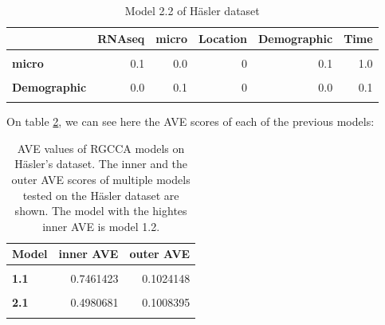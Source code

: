 \documentclass[
  a4paper,
]{book}
\begin{document}
\begin{table}[H]

\caption[Model 2.2 of Häsler dataset]{\label{tab:hasler-model-2-2}Model 2.2 of Häsler dataset}
\centering
\begin{tabular}[t]{|>{}l|>{}r||r|r|r|r}
\hline
\textbf{ } & \textbf{RNAseq} & \textbf{micro} & \textbf{Location} & \textbf{Demographic} & \textbf{Time}\\
\hline
\textbf{\cellcolor{gray!6}{RNAseq}} & \cellcolor{gray!6}{0.0} & \cellcolor{gray!6}{0.1} & \cellcolor{gray!6}{1} & \cellcolor{gray!6}{0.0} & \cellcolor{gray!6}{0.0}\\
\hline
\textbf{micro} & 0.1 & 0.0 & 0 & 0.1 & 1.0\\
\hline
\textbf{\cellcolor{gray!6}{Location}} & \cellcolor{gray!6}{1.0} & \cellcolor{gray!6}{0.0} & \cellcolor{gray!6}{0} & \cellcolor{gray!6}{0.0} & \cellcolor{gray!6}{0.0}\\
\hline
\textbf{Demographic} & 0.0 & 0.1 & 0 & 0.0 & 0.1\\
\hline
\textbf{\cellcolor{gray!6}{Time}} & \cellcolor{gray!6}{0.0} & \cellcolor{gray!6}{1.0} & \cellcolor{gray!6}{0} & \cellcolor{gray!6}{0.1} & \cellcolor{gray!6}{0.0}\\
\hline
\end{tabular}
\end{table}

On table \ref{tab:hasler-aves}, we can see here the AVE scores of each of the previous models:

\begin{table}[H]

\caption[AVE values of RGCCA models on Häsler's dataset]{\label{tab:hasler-aves}AVE values of RGCCA models on Häsler's dataset. The inner and the outer AVE scores of multiple models tested on the Häsler dataset are shown. The model with the hightes inner AVE is model 1.2.}
\centering
\begin{tabular}[t]{|>{}l|r|>{}r|}
\hline
\textbf{Model} & \textbf{inner AVE} & \textbf{outer AVE}\\
\hline
\textbf{\cellcolor{gray!6}{0}} & \cellcolor{gray!6}{0.8217371} & \cellcolor{gray!6}{0.0961236}\\
\hline
\textbf{1.1} & 0.7461423 & 0.1024148\\
\hline
\textbf{\cellcolor{gray!6}{1.2}} & \cellcolor{gray!6}{0.8349410} & \cellcolor{gray!6}{0.1025486}\\
\hline
\textbf{2.1} & 0.4980681 & 0.1008395\\
\hline
\textbf{\cellcolor{gray!6}{2.2}} & \cellcolor{gray!6}{0.7513065} & \cellcolor{gray!6}{0.1009915}\\
\hline
\end{tabular}
\end{table}
\end{document}

